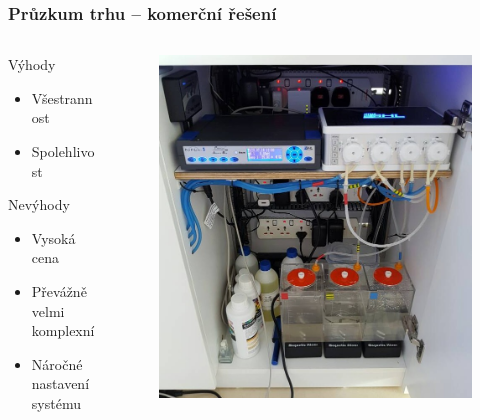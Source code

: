 \documentclass[%
  12pt,       				%
	t,                  %
	aspectratio=1610,   %
	unicode,						%
]{beamer}				    	%
\begin{document}
\begin{frame}[fragile]
	\frametitle{Průzkum trhu -- komerční řešení}
	
	\begin{columns}[T] 								%
		\begin{column}{0.5\textwidth}		%
			\begin{block}{Výhody}
				\begin{itemize}
					\item Všestrannost 
					\item Spolehlivost
				\end{itemize}
			\end{block}
			\vspace{1.5ex}%
			\begin{alertblock}{Nevýhody}
				\begin{itemize}
					\item Vysoká cena 
					\item Převážně velmi komplexní
					\item Náročné nastavení systému
				\end{itemize}
			\end{alertblock}
		\end{column}
		\begin{column}{0.5\textwidth}		%
			\begin{figure}%
				\centering
				\vspace{-0.8cm}	              %
				\includegraphics[width=\columnwidth]{obrazky/prezentace/ghl-from-forum.jpg}

\end{figure}
\end{column}
\end{columns}
\end{frame}
\end{document}
